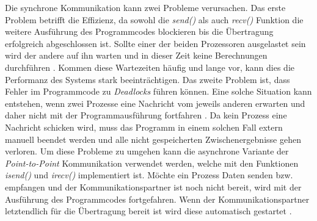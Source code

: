 Die synchrone Kommunikation kann zwei Probleme verursachen. Das erste Problem betrifft die Effizienz, da sowohl die \emph{send()} als auch \emph{recv()} Funktion die weitere Ausführung des Programmcodes blockieren bis die Übertragung erfolgreich abgeschlossen ist. Sollte einer der beiden Prozessoren ausgelastet sein wird der andere auf ihn warten und in dieser Zeit keine Berechnungen durchführen \cite{nielsen2016introduction}. Kommen diese Wartezeiten häufig und lange vor, kann dies die Performanz des Systems stark beeinträchtigen. Das zweite Problem ist, dass Fehler im Programmcode zu \emph{Deadlocks} führen können. Eine solche Situation kann entstehen, wenn zwei Prozesse eine Nachricht vom jeweils anderen erwarten und daher nicht mit der Programmausführung fortfahren \cite{nielsen2016introduction}. Da kein Prozess eine Nachricht schicken wird, muss das Programm in einem solchen Fall extern manuell beendet werden und alle nicht gespeicherten Zwischenergebnisse gehen verloren. Um diese Probleme zu umgehen kann die asynchrone Variante der \emph{Point-to-Point} Kommunikation verwendet werden, welche mit den Funktionen \emph{isend()} und \emph{irecv()} implementiert ist. Möchte ein Prozess Daten senden bzw. empfangen und der Kommunikationspartner ist noch nicht bereit, wird mit der Ausführung des Programmcodes fortgefahren. Wenn der Kommunikationspartner letztendlich für die Übertragung bereit ist wird diese automatisch gestartet \cite{nielsen2016introduction}. 


